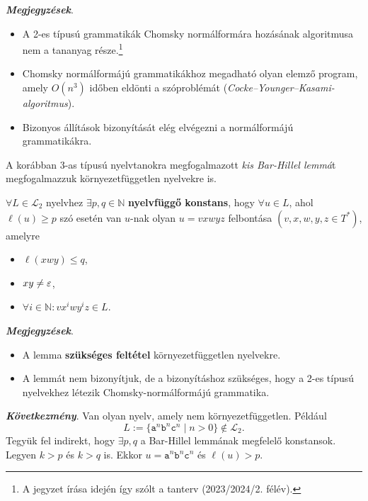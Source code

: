 \textbf{\textit{Megjegyzések}}.
\begin{itemize}
	\item A 2-es típusú grammatikák Chomsky normálformára hozásának algoritmusa nem a
	tananyag része.\footnote{A jegyzet írása idején így szólt a tanterv (2023/2024/2. félév).}
	\item Chomsky normálformájú grammatikákhoz megadható olyan elemző program,
	amely $O(n^3)$ időben eldönti a szóproblémát (\textit{Cocke--Younger--Kasami-algoritmus}).
	\item Bizonyos állítások bizonyítását elég elvégezni a normálformájú grammatikákra.
\end{itemize}

A korábban 3-as típusú nyelvtanokra megfogalmazott \textit{kis Bar-Hillel lemmá}t megfogalmazzuk környezetfüggetlen nyelvekre is.

\begin{tcolorbox}
	\begin{lemma}
		$\forall L \in \mathcal{L}_2$ nyelvhez $\exists p, q \in \mathbb{N}$ \textbf{nyelvfüggő
		konstans}, hogy $\forall u \in L$, ahol $\ell(u) \geq p$ szó esetén van
		$u$-nak olyan $u = vxwyz$ felbontása $(v, x, w, y, z \in T^*)$, amelyre
		\begin{itemize}
			\item $\ell(xwy) \leq q$,
			\item $xy \neq \varepsilon$,
			\item $\forall i \in \mathbb{N} : vx^iwy^iz \in L$.
		\end{itemize}
	\end{lemma}
\end{tcolorbox}

\textbf{\textit{Megjegyzések}}.
\begin{itemize}
	\item A lemma \textbf{szükséges feltétel} környezetfüggetlen nyelvekre.
	\item A lemmát nem bizonyítjuk, de a bizonyításhoz szükséges, hogy a
	2-es típusú nyelvekhez létezik Chomsky-normálformájú grammatika.
\end{itemize}

\textbf{\textit{Következmény}}. Van olyan nyelv, amely nem környezetfüggetlen. Például
\[ L := \{ \texttt{a}^n\texttt{b}^n\texttt{c}^n \mid n > 0 \} \notin \mathcal{L}_2. \]
Tegyük fel indirekt, hogy $\exists p, q$ a Bar-Hillel lemmának megfelelő konstansok. Legyen $k > p$ és $k > q$ is. Ekkor $u = \texttt{a}^n\texttt{b}^n\texttt{c}^n$ és $\ell(u) > p$.

